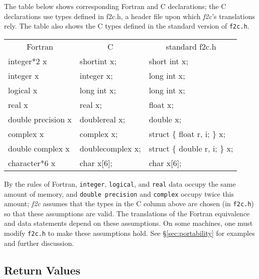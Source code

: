 \documentclass[10pt,a4paper]{article}
\begin{document}
The table below shows corresponding Fortran and C declarations; the C declarations use types defined in f2c.h, a header file upon which \emph{f2c}’s translations rely. The table also shows the C types defined in the standard version of \verb|f2c.h|.
\begin{center}
\begin{tabular}{|lll|}\hline
    \multicolumn{1}{|c}{Fortran} &
    \multicolumn{1}{c}{C} &
    \multicolumn{1}{c|}{standard f2c.h}
    \\[0.5ex]
    integer*2 x &
    shortint x; &
    short int x;
    \\
    integer x &
    integer x; &
    long int x;
    \\
    logical x &
    long int x; &
    long int x;
    \\
    real x &
    real x; &
    float x;
    \\
    double precision x &
    doublereal x; &
    double x;
    \\
    complex x &
    complex x; &
    struct \{ float r, i; \} x;
    \\
    double complex x &
    doublecomplex x; &
    struct \{ double r, i; \} x;
    \\
    character*6 x &
    char x[6]; &
    char x[6];
    \\\hline
\end{tabular}
\end{center}
By the rules of Fortran, \verb|integer|, \verb|logical|, and \verb|real| data occupy the same amount of memory, and \verb|double precision| and \verb|complex| occupy twice this amount; \emph{f2c} assumes that the types in the C column above are chosen (in \verb|f2c.h|) so that these assumptions are valid. The translations of the Fortran equivalence and data statements depend on these assumptions. On some machines, one must modify \verb|f2c.h| to make these assumptions hold. See §\ref{sec:portability} for examples and further discussion.

\subsection*{Return Values}
\end{document}
